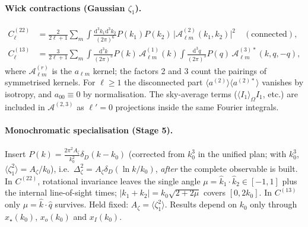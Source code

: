 \documentclass[11pt]{article}
\theoremstyle{definition}
\theoremstyle{remark}
\newcommand{\dd}{\mathrm{d}}
\newcommand{\sky}[1]{\langle #1\rangle_{\Omega}}
\newcommand{\ens}[1]{\langle #1\rangle}
\begin{document}
\paragraph{Wick contractions (Gaussian $\zeta_1$).}
\begin{align*}
C^{(22)}_\ell&=\frac{2}{2\ell+1}\sum_m\int\!\frac{\dd^3k_1\dd^3k_2}{(2\pi)^6}P(k_1)P(k_2)\,\big|\mathcal A^{(2)}_{\ell m}(k_1,k_2)\big|^2\quad(\text{connected}),\\
C^{(13)}_\ell&=\frac{3}{2\ell+1}\sum_m\int\!\frac{\dd^3k}{(2\pi)^3}P(k)\,\mathcal A^{(1)}_{\ell m}(k)\int\!\frac{\dd^3q}{(2\pi)^3}P(q)\,\mathcal A^{(3)*}_{\ell m}(k,q,-q),
\end{align*}
where $\mathcal A^{(r)}_{\ell m}$ is the $a_{\ell m}$ kernel; the factors 2
and 3 count the pairings of symmetrised kernels. For $\ell\ge1$ the
disconnected part $\ens{a^{(2)}}\ens{a^{(2)*}}$ vanishes by isotropy, and
$a_{00}\equiv0$ by normalisation. The sky-average terms
($\sky{I_1}I_1$, etc.) are included in $\mathcal A^{(2,3)}$ as
$\ell'=0$ projections inside the same Fourier integrals.

\paragraph{Monochromatic specialisation (Stage 5).} Insert
$P(k)=\frac{2\pi^2A_\zeta}{k_0^2}\delta_D(k-k_0)$ (corrected from $k_0^3$ in the
unified plan; with $k_0^3$, $\ens{\zeta_1^2}=A_\zeta/k_0$), i.e.\
$\Delta^2_\zeta=A_\zeta\delta_D(\ln k/k_0)$, \emph{after} the complete
observable is built. In $C^{(22)}$, rotational invariance leaves the single
angle $\mu=\hat k_1\cdot\hat k_2\in[-1,1]$ plus the internal line-of-sight
times; $|k_1+k_2|=k_0\sqrt{2+2\mu}$ covers $[0,2k_0]$. In $C^{(13)}$ only
$\mu=\hat k\cdot\hat q$ survives. Held fixed: $A_\zeta=\ens{\zeta_1^2}$.
Results depend on $k_0$ only through $x_\star(k_0)$, $x_o(k_0)$ and $x_I(k_0)$.
\end{document}
